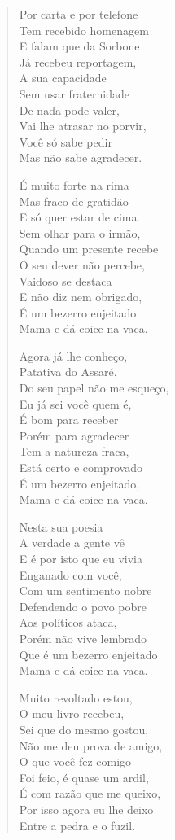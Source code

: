 \begin{verse}
Por carta e por telefone\\
Tem recebido homenagem\\
E falam que da Sorbone\\
Já recebeu reportagem,\\
A sua capacidade\\
Sem usar fraternidade\\
De nada pode valer,\\
Vai lhe atrasar no porvir,\\
Você só sabe pedir\\
Mas não sabe agradecer.

É muito forte na rima\\
Mas fraco de gratidão\\
E só quer estar de cima\\
Sem olhar para o irmão,\\
Quando um presente recebe\\
O seu dever não percebe,\\
Vaidoso se destaca\\
E não diz nem obrigado,\\
É um bezerro enjeitado\\
Mama e dá coice na vaca.

Agora já lhe conheço,\\
Patativa do Assaré,\\
Do seu papel não me esqueço,\\
Eu já sei você quem é,\\
É bom para receber\\
Porém para agradecer\\
Tem a natureza fraca,\\
Está certo e comprovado\\
É um bezerro enjeitado,\\
Mama e dá coice na vaca.

Nesta sua poesia\\
A verdade a gente vê\\
E é por isto que eu vivia\\
Enganado com você,\\
Com um sentimento nobre\\
Defendendo o povo pobre\\
Aos políticos ataca,\\
Porém não vive lembrado\\
Que é um bezerro enjeitado\\
Mama e dá coice na vaca.

Muito revoltado estou,\\
O meu livro recebeu,\\
Sei que do mesmo gostou,\\
Não me deu prova de amigo,\\
O que você fez comigo\\
Foi feio, é quase um ardil,\\
É com razão que me queixo,\\
Por isso agora eu lhe deixo\\
Entre a pedra e o fuzil.


\end{verse}
